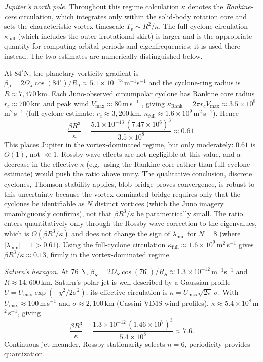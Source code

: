 \noindent
\textit{Jupiter's north pole.}
Throughout this regime calculation $\kappa$ denotes the
\emph{Rankine-core} circulation, which integrates only within the
solid-body rotation core and sets the characteristic vortex timescale
$T_v \sim R^2/\kappa$.  The full-cyclone circulation $\kappa_{\mathrm{full}}$
(which includes the outer irrotational skirt) is larger and is the
appropriate quantity for computing orbital periods and eigenfrequencies;
it is used there instead.
The two estimates are numerically distinguished below.

At $84^\circ$N, the planetary vorticity
gradient is $\beta_J = 2\Omega_J\cos(84^\circ)/R_J \approx
5.1\times10^{-13}$\,m$^{-1}$s$^{-1}$ and the cyclone-ring radius
is $R \approx 7{,}470$\,km.  Each Juno-observed circumpolar cyclone has
Rankine core radius $r_c \approx 700$\,km and peak wind $V_{\max}
\approx 80$\,m\,s$^{-1}$ \citep{Adriani2018,Gavriel2021}, giving
$\kappa_{\mathrm{Rank}} = 2\pi r_c V_{\max} \approx 3.5\times10^{8}$\,m$^2$\,s$^{-1}$
(full-cyclone estimate: $r_c \approx 3{,}200$\,km,
$\kappa_{\mathrm{full}} \approx 1.6\times10^9$\,m$^2$\,s$^{-1}$).
Hence
\[
  \frac{\beta R^3}{\kappa}
  = \frac{5.1\times10^{-13}\,(7.47\times10^6)^3}{3.5\times10^8}
  \approx 0.61.
\]
This places Jupiter in the vortex-dominated regime, but only
moderately: $0.61$ is $O(1)$, not $\ll 1$.  Rossby-wave effects
are not negligible at this value, and a decrease in the effective
$\kappa$ (e.g.\ using the Rankine-core rather than full-cyclone
estimate) would push the ratio above unity.  The qualitative
conclusion, discrete cyclones, Thomson stability applies, blob
bridge proves convergence, is robust to this uncertainty because
the vortex-dominated bridge requires only that the cyclones be
identifiable as $N$ distinct vortices (which the Juno imagery
unambiguously confirms), not that $\beta R^3/\kappa$ be
parametrically small.  The ratio enters quantitatively only
through the Rossby-wave correction to the eigenvalues, which is
$O(\beta R^3/\kappa)$ and does not change the sign of
$\lambda_{\min}$ for $N = 8$ (where
$|\lambda_{\min}| = 1 > 0.61$).
Using the full-cyclone circulation
$\kappa_{\mathrm{full}} \approx 1.6\times10^9$\,m$^2$\,s$^{-1}$
gives $\beta R^3/\kappa \approx 0.13$, firmly in the
vortex-dominated regime.

\smallskip\noindent
\textit{Saturn's hexagon.}  At $76^\circ$N, $\beta_S =
2\Omega_S\cos(76^\circ)/R_S \approx 1.3\times10^{-12}$\,m$^{-1}$s$^{-1}$
and $R \approx 14{,}600$\,km.  Saturn's polar jet is
well-described by a Gaussian profile $U = U_{\max}\exp(-y^2/2\sigma^2)$;
its effective circulation is $\kappa = U_{\max}\sqrt{2\pi}\,\sigma$.
With $U_{\max} \approx 100$\,m\,s$^{-1}$ and $\sigma \approx 2{,}100$\,km
(Cassini VIMS wind profiles), $\kappa \approx 5.4\times10^{8}$\,m$^2$\,s$^{-1}$,
giving
\[
  \frac{\beta R^3}{\kappa}
  = \frac{1.3\times10^{-12}\,(1.46\times10^7)^3}{5.4\times10^8}
  \approx 7.6.
\]
Continuous jet meander, Rossby stationarity selects $n = 6$, periodicity
provides quantization.


